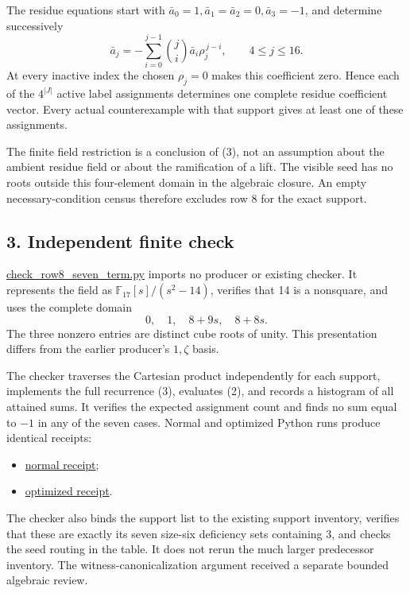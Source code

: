 \documentclass[
  british,
  10pt,
]{article}
\providecommand{\tightlist}{%
  \setlength{\itemsep}{0pt}\setlength{\parskip}{0pt}}
\begin{document}
The residue equations start with
\(\bar a_0=1,\bar a_1=\bar a_2=0,\bar a_3=-1\), and determine
successively \[
\bar a_j=-\sum_{i=0}^{j-1}
\binom ji\bar a_i\rho_j^{\,j-i},
\qquad 4\le j\le16.
\tag{3}
\] At every inactive index the chosen \(\rho_j=0\) makes this
coefficient zero. Hence each of the \(4^{|J|}\) active label assignments
determines one complete residue coefficient vector. Every actual
counterexample with that support gives at least one of these
assignments.

The finite field restriction is a conclusion of (3), not an assumption
about the ambient residue field or about the ramification of a lift. The
visible seed has no roots outside this four-element domain in the
algebraic closure. An empty necessary-condition census therefore
excludes row 8 for the exact support.

\subsection{3. Independent finite check}\label{independent-finite-check}

\href{new-results/check_row8_seven_term.py}{check\_row8\_seven\_term.py}
imports no producer or existing checker. It represents the field as
\(\mathbb F_{17}[s]/(s^2-14)\), verifies that 14 is a nonsquare, and
uses the complete domain \[
0,\quad1,\quad8+9s,\quad8+8s.
\] The three nonzero entries are distinct cube roots of unity. This
presentation differs from the earlier producer's \(1,\zeta\) basis.

The checker traverses the Cartesian product independently for each
support, implements the full recurrence (3), evaluates (2), and records
a histogram of all attained sums. It verifies the expected assignment
count and finds no sum equal to \(-1\) in any of the seven cases. Normal
and optimized Python runs produce identical receipts:

\begin{itemize}
\tightlist
\item
  \href{new-results/row8-seven-term-normal.json}{normal receipt};
\item
  \href{new-results/row8-seven-term-optimized.json}{optimized receipt}.
\end{itemize}

The checker also binds the support list to the existing support
inventory, verifies that these are exactly its seven size-six deficiency
sets containing 3, and checks the seed routing in the table. It does not
rerun the much larger predecessor inventory. The
witness-canonicalization argument received a separate bounded algebraic
review.
\end{document}
